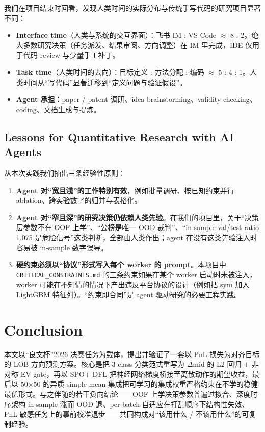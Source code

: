 \documentclass[11pt]{article}
\begin{document}
我们在项目结束时回看，发现人类时间的实际分布与传统手写代码的研究项目显著不同：
\begin{itemize}
  \item \textbf{Interface time}（人类与系统的交互界面）：飞书 IM : VS Code $\approx$ 8 : 2。绝大多数研究决策（任务派发、结果审阅、方向调整）在 IM 里完成，IDE 仅用于代码 review 与少量手工补丁。
  \item \textbf{Task time}（人类时间的去向）：目标定义 : 方法分配 : 编码 $\approx$ 5 : 4 : 1。人类时间从``写代码''显著迁移到``定义问题与验证假设''。
  \item \textbf{Agent 承担}：paper / patent 调研、idea brainstorming、validity checking、coding、文档生成与提炼。
\end{itemize}

\subsection{Lessons for Quantitative Research with AI Agents}

从本次实践我们抽出三条经验性原则：
\begin{enumerate}
  \item \textbf{Agent 对``宽且浅''的工作特别有效}，例如批量调研、按已知约束并行 ablation、跨实验数字的归并与表格化。
  \item \textbf{Agent 对``窄且深''的研究决策仍依赖人类先验}。在我们的项目里，关于``决策层参数不在 OOF 上学''、``公榜是唯一 OOD 裁判''、``in-sample val/test ratio 1.075 是危险信号''这类判断，全部由人类作出；agent 在没有这类先验注入时容易被 in-sample 数字误导。
  \item \textbf{硬约束必须以``协议''形式写入每个 worker 的 prompt}。本项目中 \texttt{CRITICAL\_CONSTRAINTS.md} 的三条约束如果在某个 worker 启动时未被注入，worker 可能在不知情的情况下产出违反平台协议的设计（例如把 sym 加入 LightGBM 特征列）。``约束即合同''是 agent 驱动研究的必要工程实践。
\end{enumerate}

\section{Conclusion}
\label{sec:concl}

本文以``良文杯''2026 决赛任务为载体，提出并验证了一套以 PnL 损失为对齐目标的 LOB 方向预测方案。核心是把 3-class 分类范式重写为 $\Delta$mid 的 L2 回归 $+$ 非对称 EV gate，再以 SPO+ DFL 把神经网络梯度桥接至离散动作的期望收益，最后以 50$\times$50 的异质 simple-mean 集成把可学习的集成权重严格约束在不学的稳健最优形式。与之伴随的若干负向结论——OOF 上学决策参数普遍过拟合、深度时序架构 in-sample 涨而 OOD 退、per-batch 自适应在打乱顺序下结构性失效、PnL-敏感任务上的事前校准退步——共同构成对``该用什么 / 不该用什么''的可复制经验。
\end{document}
